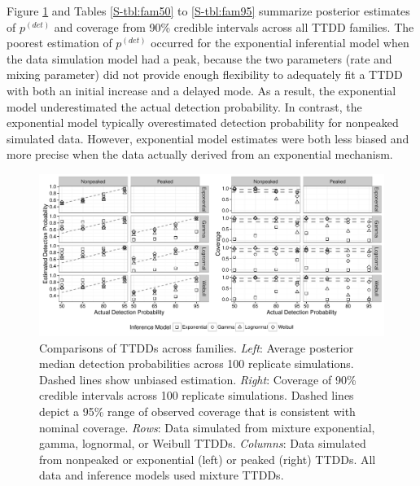 \documentclass[12pt]{article}
\newcommand{\pdet}{p^{(det)}}
\begin{document}
Figure \ref{fig:family_fig} and Tables \ref{S-tbl:fam50} to \ref{S-tbl:fam95} summarize posterior estimates of $\pdet$ and coverage from 90\% credible intervals across all TTDD families.
The poorest estimation of $\pdet$ occurred for the exponential inferential model when the data simulation model had a peak, because the two parameters (rate and mixing parameter) did not provide enough flexibility to adequately fit a TTDD with both an initial increase and a delayed mode. 
As a result, the exponential model underestimated the actual detection probability.
In contrast, the exponential model typically overestimated detection probability for nonpeaked simulated data.
However, exponential model estimates were both less biased and more precise when the data actually derived from an exponential mechanism.

\begin{figure}\centering
\includegraphics[width=\textwidth]{"Sims/SimZero/family_fig"}
\caption{
Comparisons of TTDDs across families.  \textit{Left}: Average posterior median detection probabilities across 100 replicate simulations.  Dashed lines show unbiased estimation.   \textit{Right}: Coverage of 90\% credible intervals across 100 replicate simulations.  Dashed lines depict a 95\% range of observed coverage that is consistent with nominal coverage.  \textit{Rows}:  Data simulated from mixture exponential, gamma, lognormal, or Weibull TTDDs.  \textit{Columns}: Data simulated from nonpeaked or exponential (left) or peaked (right) TTDDs.  All data and inference models used mixture TTDDs.
}
\label{fig:family_fig}
\end{figure}
\end{document}
